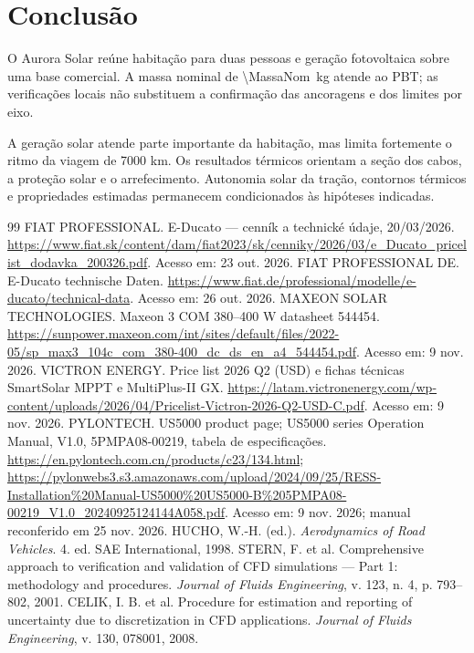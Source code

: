 \documentclass[12pt,a4paper]{article}
\begin{document}
\section{Conclusão}
O Aurora Solar reúne habitação para duas pessoas e geração fotovoltaica sobre uma base
comercial. A massa nominal de \SI{\MassaNom}{kg} atende ao PBT; as verificações locais
não substituem a confirmação das ancoragens e dos limites por eixo.

A geração solar atende parte importante da habitação, mas limita fortemente o ritmo da
viagem de 7000 km. Os resultados térmicos orientam a seção dos cabos, a proteção solar e
o arrefecimento. Autonomia solar da tração, contornos térmicos e propriedades estimadas
permanecem condicionados às hipóteses indicadas.

\begin{thebibliography}{99}\small
\setlength{\itemsep}{2pt}\setlength{\parskip}{0pt}
 FIAT PROFESSIONAL. E-Ducato — cenník a technické údaje, 20/03/2026. \url{https://www.fiat.sk/content/dam/fiat2023/sk/cenniky/2026/03/e_Ducato_pricelist_dodavka_200326.pdf}. Acesso em: 23 out. 2026.
 FIAT PROFESSIONAL DE. E-Ducato technische Daten. \url{https://www.fiat.de/professional/modelle/e-ducato/technical-data}. Acesso em: 26 out. 2026.
 MAXEON SOLAR TECHNOLOGIES. Maxeon 3 COM 380--400 W datasheet 544454. \url{https://sunpower.maxeon.com/int/sites/default/files/2022-05/sp_max3_104c_com_380-400_dc_ds_en_a4_544454.pdf}. Acesso em: 9 nov. 2026.
 VICTRON ENERGY. Price list 2026 Q2 (USD) e fichas técnicas SmartSolar MPPT e MultiPlus-II GX. \url{https://latam.victronenergy.com/wp-content/uploads/2026/04/Pricelist-Victron-2026-Q2-USD-C.pdf}. Acesso em: 9 nov. 2026.
 PYLONTECH. US5000 product page; US5000 series Operation Manual, V1.0, 5PMPA08-00219, tabela de especificações. \url{https://en.pylontech.com.cn/products/c23/134.html}; \url{https://pylonwebs3.s3.amazonaws.com/upload/2024/09/25/RESS-Installation%20Manual-US5000%20US5000-B%205PMPA08-00219_V1.0_20240925124144A058.pdf}. Acesso em: 9 nov. 2026; manual reconferido em 25 nov. 2026.
 HUCHO, W.-H. (ed.). \emph{Aerodynamics of Road Vehicles}. 4. ed. SAE International, 1998.
 STERN, F. et al. Comprehensive approach to verification and validation of CFD simulations — Part 1: methodology and procedures. \emph{Journal of Fluids Engineering}, v. 123, n. 4, p. 793--802, 2001.
 CELIK, I. B. et al. Procedure for estimation and reporting of uncertainty due to discretization in CFD applications. \emph{Journal of Fluids Engineering}, v. 130, 078001, 2008.

\end{thebibliography}
\end{document}
